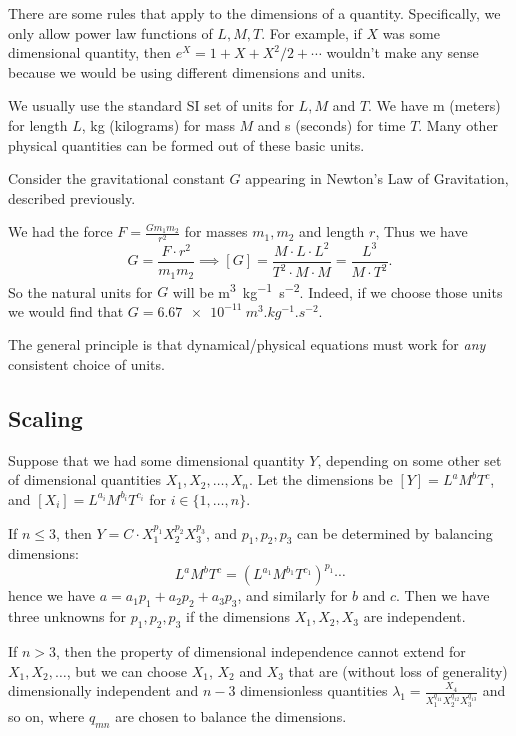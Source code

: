 \documentclass[a4paper]{scrartcl}
\newcommand{\newsection}{\subsection}
\begin{document}
There are some rules that apply to the dimensions of a quantity. Specifically, we only allow power law functions of $L, M, T$. 
For example, if $X$ was some dimensional quantity, then $e^X = 1 + X + X^2/2 + \cdots$ wouldn't make any sense because we would be using different dimensions and units.

We usually use the standard SI set of units for $L, M$ and $T$. We have \si{m} (meters) for length $L$, \si{kg} (kilograms) for mass $M$ and \si{s} (seconds) for time $T$. Many other physical quantities can be formed out of these basic units. 

\begin{example}
	Consider the gravitational constant $G$ appearing in Newton's Law of Gravitation, described previously.

	We had the force $F = \frac{Gm_1 m_2}{r^2}$ for masses $m_1, m_2$ and length $r$, Thus we have
$$
	G = \frac{F \cdot r^2}{m_1 m_2} \implies [G] = \frac{M \cdot L \cdot L^2}{T^2 \cdot M \cdot M} = \frac{L^3}{M \cdot T^2}.
$$
So the natural units for $G$ will be \si{m^3 .kg^{-1}. s^{-2}}. Indeed, if we choose those units we would find that $G = \SI{6.67e-11}{m^3 .kg^{-1}. s^{-2}}$.
\end{example}

The general principle is that dynamical/physical equations must work for \emph{any} consistent choice of units.

\newsection{Scaling}

Suppose that we had some dimensional quantity $Y$, depending on some other set of dimensional quantities $X_1, X_2, \dots, X_n$. Let the dimensions be $[Y] = L^a M^b T^c$, and $[X_i] = L^{a_i} M^{b_i} T^{c_i}$ for $i \in \{1, \dots, n\}$. 

If $n \leq 3$, then $Y = C \cdot X_1^{p_1} X_2^{p_2} X_3^{p_3}$, and $p_1, p_2, p_3$ can be determined by balancing dimensions:
$$
L^a M^b T^c = (L^{a_1} M^{b_1} T^{c_1})^{p_1} \cdots
$$
hence we have $a = a_1 p_1 + a_2 p_2 + a_3 p_3$, and similarly for $b$ and $c$. Then we have three unknowns for $p_1, p_2, p_3$ if the dimensions $X_1, X_2, X_3$ are independent.

If $n > 3$, then the property of dimensional independence cannot extend for $X_1, X_2, \dots$, but we can choose $X_1$, $X_2$ and $X_3$ that are (without loss of generality) dimensionally independent and $n - 3$ dimensionless quantities $\lambda_1 = \frac{X_4}{X_1^{q_{11}} X_2^{q_{12}} X_3^{q_{13}}}$ and so on, where $q_{mn}$ are chosen to balance the dimensions.
\end{document}
